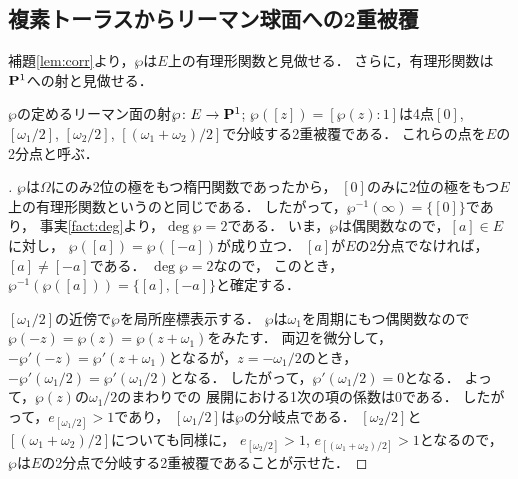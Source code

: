 \subsection{複素トーラスからリーマン球面への2重被覆}
補題\ref{lem:corr}より，$\wp$は$E$上の有理形関数と見做せる．
さらに，有理形関数は$\mathbf{P}^1$への射と見做せる．
\begin{Theorem}
    $\wp$の定めるリーマン面の射$\wp\colon E\to\mathbf{P}^1$; 
    $\wp([z])=[\wp(z):1]$は4点$[0]$, 
    $[\omega_1/2]$, $[\omega_2/2]$, 
    $[(\omega_1+\omega_2)/2]$で分岐する2重被覆である．
    これらの点を$E$の2分点と呼ぶ．
\end{Theorem}
\begin{proof}[\pfb]
    $\wp$は$\Omega$にのみ2位の極をもつ楕円関数であったから，
    $[0]$のみに2位の極をもつ$E$上の有理形関数というのと同じである．
    したがって，$\wp^{-1}(\infty)=\{[0]\}$であり，
    事実\ref{fact:deg}より，$\deg\wp=2$である．
    いま，$\wp$は偶関数なので，$[a]\in E$に対し，
    $\wp([a])=\wp([-a])$が成り立つ．
    $[a]$が$E$の2分点でなければ，$[a]\neq[-a]$である．
    $\deg\wp=2$なので，
    このとき，$\wp^{-1}(\wp([a]))=\{[a],[-a]\}$と確定する．

    $[\omega_1/2]$の近傍で$\wp$を局所座標表示する．
    $\wp$は$\omega_1$を周期にもつ偶関数なので
    $\wp(-z)=\wp(z)=\wp(z+\omega_1)$をみたす．
    両辺を微分して，
    $-\wp'(-z)=\wp'(z+\omega_1)$となるが，$z=-\omega_1/2$のとき，
    $-\wp'(\omega_1/2)=\wp'(\omega_1/2)$となる．
    したがって，$\wp'(\omega_1/2)=0$となる．
    よって，$\wp(z)$の$\omega_1/2$のまわりでの
    展開における1次の項の係数は0である．
    したがって，$e_{[\omega_1/2]}>1$であり，
    $[\omega_1/2]$は$\wp$の分岐点である．
    $[\omega_2/2]$と$[(\omega_1+\omega_2)/2]$についても同様に，
    $e_{[\omega_2/2]}>1$, $e_{[(\omega_1+\omega_2)/2]}>1$となるので，
    $\wp$は$E$の2分点で分岐する2重被覆であることが示せた．
\end{proof}